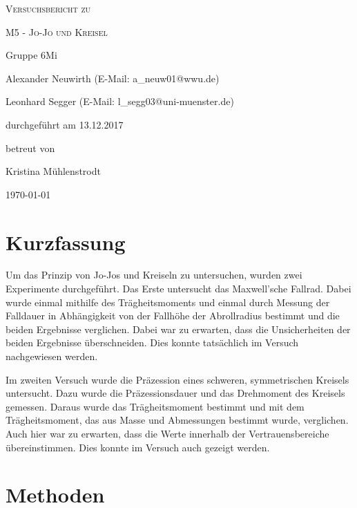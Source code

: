 \documentclass[
	a4paper,
	12pt,
	pagesize,
	ngerman
]{scrartcl}
\begin{document}
	
	\begin{titlepage}
		\centering
		{\scshape\LARGE Versuchsbericht zu \par}
		\vspace{1cm}
		{\scshape\huge M5 - Jo-Jo und Kreisel\par}
		\vspace{2.5cm}
		{\LARGE Gruppe 6Mi \par}
		\vspace{0.5cm}
		
		{\large Alexander Neuwirth (E-Mail: a\_neuw01@wwu.de) \par}
		{\large Leonhard Segger (E-Mail: l\_segg03@uni-muenster.de) \par}
		\vfill
		
		durchgeführt am 13.12.2017\par
		betreut von\par
		{\large Kristina Mühlenstrodt} %
		
		\vfill
		
		{\large \today\par}
	\end{titlepage}
	\tableofcontents
	\newpage

	\section{Kurzfassung}
	Um das Prinzip von Jo-Jos und Kreiseln zu untersuchen, wurden zwei Experimente durchgeführt.
	Das Erste untersucht das Maxwell'sche Fallrad.
	Dabei wurde einmal mithilfe des Trägheitsmoments und einmal durch Messung der Falldauer in Abhängigkeit von der Fallhöhe der Abrollradius bestimmt und die beiden Ergebnisse verglichen.
	Dabei war zu erwarten, dass die Unsicherheiten der beiden Ergebnisse überschneiden.
	Dies konnte tatsächlich im Versuch nachgewiesen werden.
	\par
	Im zweiten Versuch wurde die Präzession eines schweren, symmetrischen Kreisels untersucht.
	Dazu wurde die Präzessionsdauer und das Drehmoment des Kreisels gemessen.
	Daraus wurde das Trägheitsmoment bestimmt und mit dem Trägheitsmoment, das aus Masse und Abmessungen bestimmt wurde, verglichen. %
	Auch hier war zu erwarten, dass die Werte innerhalb der Vertrauensbereiche übereinstimmen.
	Dies konnte im Versuch auch gezeigt werden.
	\section{Methoden}
\end{document}
